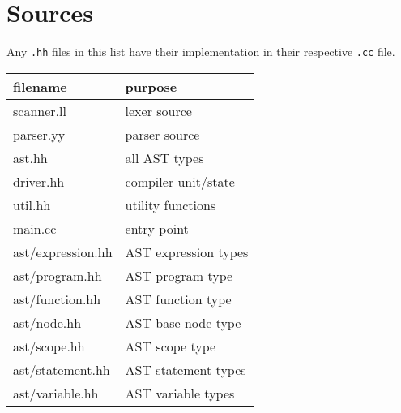 \documentclass{article}
\begin{document}
\section{Sources}
Any \texttt{.hh} files in this list have their implementation in their respective \texttt{.cc} file.\\
\begin{center}
\begin{table}[H]
\begin{tabular}{ll}
\hline
\multicolumn{1}{|l|}{filename} & \multicolumn{1}{l|}{purpose} \\ \hline
scanner.ll                     & lexer source                 \\
parser.yy                      & parser source                \\
ast.hh                         & all AST types                \\
driver.hh                      & compiler unit/state          \\
util.hh                        & utility functions            \\
main.cc                        & entry point                  \\
ast/expression.hh              & AST expression types         \\
ast/program.hh                 & AST program type             \\
ast/function.hh                & AST function type            \\
ast/node.hh                    & AST base node type           \\
ast/scope.hh                   & AST scope type               \\
ast/statement.hh               & AST statement types          \\
ast/variable.hh                & AST variable types          
\end{tabular}
\end{table}
\end{center}
\end{document}
